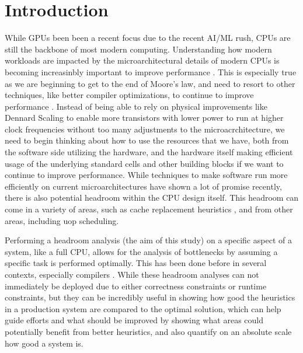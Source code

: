 \documentclass[sigconf]{acmart}
\begin{document}


\maketitle

\section{Introduction}

While GPUs been been a recent focus due to the recent AI/ML rush, CPUs are still the backbone of most
modern computing. Understanding how modern workloads are impacted by the microarchitectural details of
modern CPUs is becoming increasinbly important to improve performance \cite{moseley2015warehouseprofiling}.
This is especially true as we are beginning to get to the end of Moore's law, and need to resort to other
techniques, like better compiler optimizations, to continue to improve performance \cite{lattner2020mlir}.
Instead of being able to rely on physical improvements like Dennard Scaling to enable more transistors with lower
power to run at higher clock frequencies without too many adjustments to the microacrchitecture, we need to begin
thinking about how to use the resources that we have, both from the software side utilizing the hardware, and the
hardware itself making efficient usage of the underlying standard cells and other building blocks if we want
to continue to improve performance.
While techniques to make software run more efficiently on current microarchitectures have shown a lot of
promise recently, there is also potential headroom within the CPU design
itself. This headroom can come in a variety of areas, such as cache replacement heuristics \cite{moseley2023emissary},
and from other areas, including uop scheduling.

Performing a headroom analysis (the aim of this study) on a specific aspect of a system, like a full CPU, allows
for the analysis of bottlenecks by assuming a specific task is performed optimally. This has been done before in
several contexts, especially compilers \cite{doerfert2023oraql} \cite{lozano2019combinatorialregalloc}. While these
headroom analyses can not immediately be deployed due to either correctness constraints or runtime constraints,
but they can be incredibly useful in showing how good the heuristics in a production system are compared to the
optimal solution, which can help guide efforts and what should be improved by showing what areas could potentially
benefit from better heuristics, and also quantify on an absolute scale how good a system is.
\end{document}
